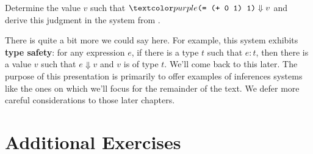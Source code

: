 \begin{exercise}
  Determine the value $v$ such that $\codel{(= (+ 0 1) 1)} \Downarrow v$ and derive this judgment in the system from .
\end{exercise}
There is quite a bit more we could say here.
For example, this system exhibits \textbf{type safety}: for any expression $e$, if there is a type $t$ such that $e : t$, then there is a value $v$ such that $e \Downarrow v$ and $v$ is of type $t$.
We'll come back to this later.
The purpose of this presentation is primarily to offer examples of inferences systems like the ones on which we'll focus for the remainder of the text.
We defer more careful considerations to those later chapters.

\section{Additional Exercises}
